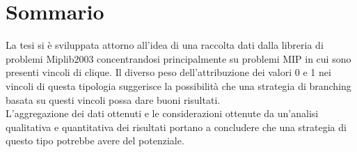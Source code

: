 \documentclass[12pt,a4paper,twoside,openright]{book}
\begin{document}
\tableofcontents
\listoffigures




\frontmatter

\chapter{Sommario}
La tesi si è sviluppata attorno all’idea di una raccolta dati
dalla libreria di problemi Miplib2003 concentrandosi principalmente
su problemi MIP in cui sono presenti vincoli di clique. 
Il diverso peso dell’attribuzione dei valori 0 e 1 nei vincoli di 
questa tipologia suggerisce la possibilità che una strategia di branching basata 
su questi vincoli possa dare buoni risultati.
\\L'aggregazione dei dati ottenuti e le considerazioni ottenute da un'analisi 
qualitativa e quantitativa dei risultati portano a concludere che una strategia
di questo tipo potrebbe avere del potenziale.
\end{document}
